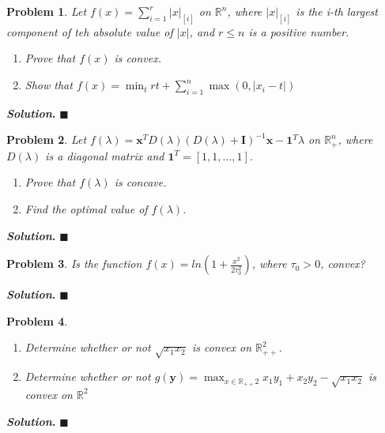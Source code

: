 \documentclass[12pt]{article}
\newtheorem{problem}{Problem}
\newenvironment{solution}[1][\textit{Solution}]{\textbf{#1. }}{$\blacksquare$}
\begin{document}
  \begin{problem}
    Let $f(x) = \sum_{i=1}^{r} |x|_{[i]}$ on $\mathbb{R}^n$, where $|x|_{[i]}$ is the \it{i}-th largest component of teh absolute value of $|x|$, and $r \leq n$ is a positive number. 
    \begin{enumerate}
      \item Prove that $f(x)$ is convex.
      \item Show that $f(x) = \min_{t}rt + \sum_{i=1}^{n} \max(0, |x_{i} - t|)$
    \end{enumerate}
  \end{problem}
  \begin{solution}
  \end{solution}

  \begin{problem}
    Let $f(\lambda) = \textbf{x}^{T} D(\lambda)(D(\lambda) + \textbf{I})^{-1}\textbf{x} - \textbf{1}^{T}\lambda$ on $\mathbb{R}^{n}_{+}$, where $D(\lambda)$ is a diagonal matrix and $\textbf{1}^T = [1, 1, ..., 1]$.
    \begin{enumerate}
      \item Prove that $f(\lambda)$ is concave.
      \item Find the optimal value of $f(\lambda)$.
    \end{enumerate}
  \end{problem}
  \begin{solution}
  \end{solution}

 \begin{problem}
   Is the function $f(x) = ln(1 + \frac{x^2}{2 \tau^{2}_{0}})$, where $\tau_{0} > 0$, convex?
  \end{problem}
  \begin{solution}
  \end{solution}

  \begin{problem}
    \begin{enumerate}
      \item Determine whether or not $\sqrt{x_{1}x_{2}}$ is convex on $\mathbb{R}^{2}_{++}$.
    \item Determine whether or not $g(\textbf{y}) = \max_{x \in \mathbb{R}_{++}{2}} x_{1}y_{1} + x_{2}y_{2} - \sqrt{x_{1}x_{2}}$ is convex on $\mathbb{R}^2$
    \end{enumerate}
  \end{problem}
  \begin{solution}
  \end{solution}
\end{document}
